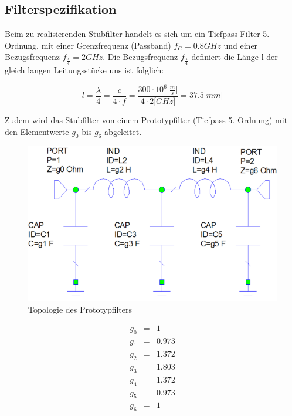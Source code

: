 \subsection{Filterspezifikation}

Beim zu realisierenden Stubfilter handelt es sich um ein Tiefpass-Filter 5. Ordnung, mit einer Grenzfrequenz (Passband) $f_C = 0.8GHz $ und einer Bezugsfrequenz $f_{\frac{\lambda}{4}} = 2GHz$. Die Bezugsfrequenz $f_{\frac{\lambda}{4}}$ definiert die Länge l der gleich langen Leitungsstücke uns ist folglich:

\begin{equation*}
l = \frac{\lambda}{4} = \frac{c}{4 \cdot f} = \frac{300\cdot 10^6 \lbrack\frac{m}{s}\rbrack}{4 \cdot 2 \lbrack GHz \rbrack} =37.5 \lbrack mm \rbrack
\end{equation*}

Zudem wird das Stubfilter von einem Prototypfilter (Tiefpass 5. Ordnung) 
mit den Elementwerte $g_0$ bis $g_6$ abgeleitet.

\begin{figure}[h!]
\centering
 	\includegraphics[width=\imagewidth]{images/Topologie_Prototyp.png}
 	\caption{Topologie des Prototypfilters}
 	\label{fig:Topologie_Prototyp.png}
\end{figure}

\begin{mdframed}
\begin{equation*} 
\begin{array}{rclcl} 
g_0 & = & 1 \\ 
g_1 & = & 0.973 \\ 
g_2 & = & 1.372 \\ 
g_3 & = & 1.803 \\ 
g_4 & = & 1.372 \\ 
g_5 & = & 0.973 \\ 
g_6 & = & 1 \\ 
\end{array} 
\end{equation*} 
\end{mdframed}

